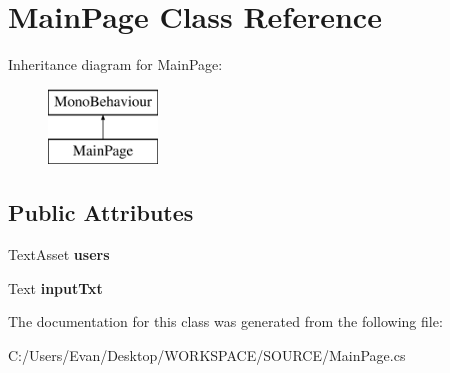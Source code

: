\hypertarget{class_main_page}{}\section{Main\+Page Class Reference}
\label{class_main_page}
Inheritance diagram for Main\+Page\+:\begin{figure}[H]
\begin{center}
\leavevmode
\includegraphics[height=2.000000cm]{class_main_page}
\end{center}
\end{figure}
\subsection*{Public Attributes}
\begin{DoxyCompactItemize}
\item 
\mbox{\label{class_main_page_ad8ce455a8dbdf90c4a3c8424a81b0b93}} 
Text\+Asset {\bfseries users}
\item 
\mbox{\label{class_main_page_aff04f3e2099c0844361464da02f0e585}} 
Text {\bfseries input\+Txt}
\end{DoxyCompactItemize}


The documentation for this class was generated from the following file\+:\begin{DoxyCompactItemize}
\item 
C\+:/\+Users/\+Evan/\+Desktop/\+W\+O\+R\+K\+S\+P\+A\+C\+E/\+S\+O\+U\+R\+C\+E/Main\+Page.\+cs\end{DoxyCompactItemize}
